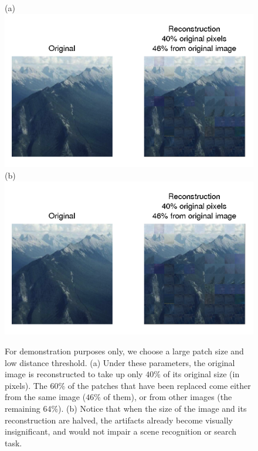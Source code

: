  \begin{figure}
\centering
(a) \includegraphics[width=0.9\linewidth]{Figures/184.png}
(b) \includegraphics[width=0.4\linewidth]{Figures/184.png}
\caption{For demonstration purposes only, we choose a large patch size and low distance threshold. (a) Under these parameters, the original image is reconstructed to take up only $40\%$ of its original size (in pixels). The $60\%$ of the patches that have been replaced come either from the same image ($46\%$ of them), or from other images (the remaining $64\%$). (b) Notice that when the size of the image and its reconstruction are halved, the artifacts already become visually insignificant, and would not impair a scene recognition or search task. }
\label{fig:badrecon}
\end{figure}

